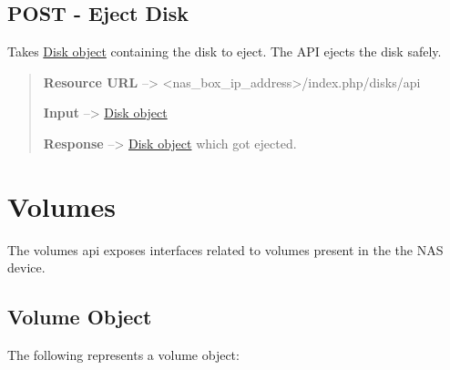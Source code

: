 \documentclass[letterpaper,10pt,english]{sphinxmanual}
\begin{document}
\section{POST - Eject Disk}
\label{disks:post-eject-disk}
Takes {\hyperref[disks:disk-object-label]{Disk object}} containing the disk to eject.
The API ejects the disk safely.
\begin{quote}

\textbf{Resource URL} --\textgreater{} \textless{}nas\_box\_ip\_address\textgreater{}/index.php/disks/api

\textbf{Input} --\textgreater{} {\hyperref[disks:disk-object-label]{Disk object}}

\textbf{Response} --\textgreater{} {\hyperref[disks:disk-object-label]{Disk object}} which got ejected.
\end{quote}


\chapter{Volumes}
\label{volumes::doc}\label{volumes:volumes-label}\label{volumes:volumes}
The volumes api exposes interfaces related to volumes present in the the NAS device.


\section{Volume Object}
\label{volumes:volume-object}\label{volumes:volume-object-label}
The following represents a volume object:
\end{document}
